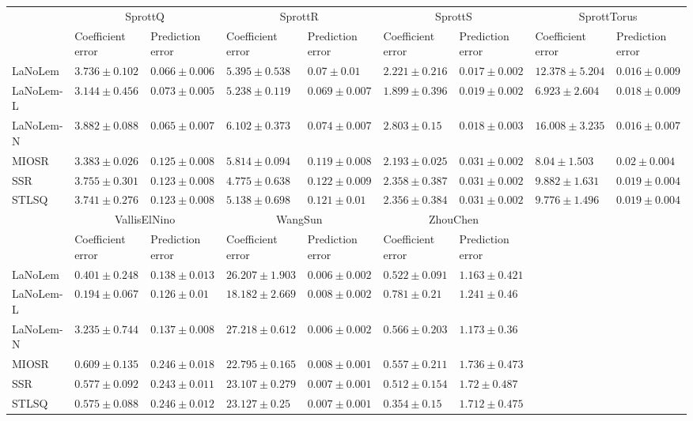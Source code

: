 \begin{table*}
{\begin{tabular}{lllllllll}
 & \multicolumn{2}{c}{SprottQ} & \multicolumn{2}{c}{SprottR} & \multicolumn{2}{c}{SprottS} & \multicolumn{2}{c}{SprottTorus} \\
 & Coefficient error & Prediction error & Coefficient error & Prediction error & Coefficient error & Prediction error & Coefficient error & Prediction error \\
\midrule
LaNoLem & $3.736\pm 0.102$ & $0.066\pm 0.006$ & $5.395\pm 0.538$ & $0.07\pm 0.01$ & $2.221\pm 0.216$ & $\mathbf{0.017}\pm 0.002$ & $12.378\pm 5.204$ & $0.016\pm 0.009$ \\
LaNoLem-L & $\mathbf{3.144}\pm 0.456$ & $0.073\pm 0.005$ & $5.238\pm 0.119$ & $\mathbf{0.069}\pm 0.007$ & $\mathbf{1.899}\pm 0.396$ & $0.019\pm 0.002$ & $\mathbf{6.923}\pm 2.604$ & $0.018\pm 0.009$ \\
LaNoLem-N & $3.882\pm 0.088$ & $\mathbf{0.065}\pm 0.007$ & $6.102\pm 0.373$ & $0.074\pm 0.007$ & $2.803\pm 0.15$ & $0.018\pm 0.003$ & $16.008\pm 3.235$ & $\mathbf{0.016}\pm 0.007$ \\
MIOSR & $3.383\pm 0.026$ & $0.125\pm 0.008$ & $5.814\pm 0.094$ & $0.119\pm 0.008$ & $2.193\pm 0.025$ & $0.031\pm 0.002$ & $8.04\pm 1.503$ & $0.02\pm 0.004$ \\
SSR & $3.755\pm 0.301$ & $0.123\pm 0.008$ & $\mathbf{4.775}\pm 0.638$ & $0.122\pm 0.009$ & $2.358\pm 0.387$ & $0.031\pm 0.002$ & $9.882\pm 1.631$ & $0.019\pm 0.004$ \\
STLSQ & $3.741\pm 0.276$ & $0.123\pm 0.008$ & $5.138\pm 0.698$ & $0.121\pm 0.01$ & $2.356\pm 0.384$ & $0.031\pm 0.002$ & $9.776\pm 1.496$ & $0.019\pm 0.004$ \\

\midrule

 & \multicolumn{2}{c}{VallisElNino} & \multicolumn{2}{c}{WangSun} & \multicolumn{2}{c}{ZhouChen} \\
 & Coefficient error & Prediction error & Coefficient error & Prediction error & Coefficient error & Prediction error \\
\midrule
LaNoLem & $0.401\pm 0.248$ & $0.138\pm 0.013$ & $26.207\pm 1.903$ & $0.006\pm 0.002$ & $0.522\pm 0.091$ & $\mathbf{1.163}\pm 0.421$ \\
LaNoLem-L & $\mathbf{0.194}\pm 0.067$ & $\mathbf{0.126}\pm 0.01$ & $\mathbf{18.182}\pm 2.669$ & $0.008\pm 0.002$ & $0.781\pm 0.21$ & $1.241\pm 0.46$ \\
LaNoLem-N & $3.235\pm 0.744$ & $0.137\pm 0.008$ & $27.218\pm 0.612$ & $\mathbf{0.006}\pm 0.002$ & $0.566\pm 0.203$ & $1.173\pm 0.36$ \\
MIOSR & $0.609\pm 0.135$ & $0.246\pm 0.018$ & $22.795\pm 0.165$ & $0.008\pm 0.001$ & $0.557\pm 0.211$ & $1.736\pm 0.473$ \\
SSR & $0.577\pm 0.092$ & $0.243\pm 0.011$ & $23.107\pm 0.279$ & $0.007\pm 0.001$ & $0.512\pm 0.154$ & $1.72\pm 0.487$ \\
STLSQ & $0.575\pm 0.088$ & $0.246\pm 0.012$ & $23.127\pm 0.25$ & $0.007\pm 0.001$ & $\mathbf{0.354}\pm 0.15$ & $1.712\pm 0.475$ \\

\bottomrule
\end{tabular}
}
\end{table*}
